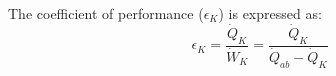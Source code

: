 The coefficient of performance (\(\epsilon_K\)) is expressed as:  
\[
\epsilon_K = \frac{\dot{Q}_K}{\dot{W}_K} = \frac{\dot{Q}_K}{\dot{Q}_{ab} - \dot{Q}_K}
\]